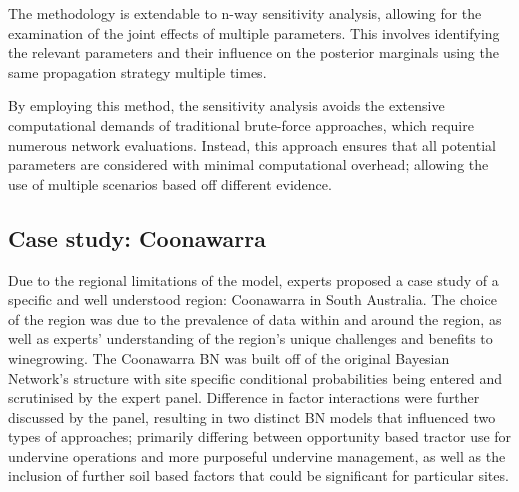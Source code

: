 The methodology is extendable to n-way sensitivity analysis, allowing for the examination of the joint effects of multiple parameters. This involves identifying the relevant parameters and their influence on the posterior marginals using the same propagation strategy multiple times.

By employing this method, the sensitivity analysis avoids the extensive computational demands of traditional brute-force approaches, which require numerous network evaluations. Instead, this approach ensures that all potential parameters are considered with minimal computational overhead; allowing the use of multiple scenarios based off different evidence.

\subsection{Case study: Coonawarra}

Due to the regional limitations of the model, experts proposed a case study of a specific and well understood region: Coonawarra in South Australia. The choice of the region was due to the prevalence of data within and around the region, as well as experts' understanding of the region's unique challenges and benefits to winegrowing. The Coonawarra BN was built off of the original Bayesian Network's structure with site specific conditional probabilities being entered and scrutinised by the expert panel. Difference in factor interactions were further discussed by the panel, resulting in two distinct BN models that influenced two types of approaches; primarily differing between opportunity based tractor use for undervine operations and more purposeful undervine management, as well as the inclusion of further soil based factors that could be significant for particular sites.





